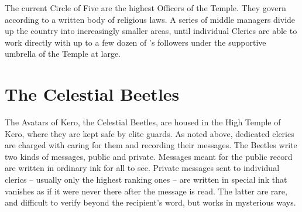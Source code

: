 \documentclass[blue]{GL2020}
\begin{document}
The current Circle of Five are the highest Officers of the Temple. They govern according to a written body of religious laws. A series of middle managers divide up the country into increasingly smaller areas, until individual Clerics are able to work directly with up to a few dozen of \cTechGod{}'s followers under the supportive umbrella of the Temple at large.

\section*{The Celestial Beetles}
The Avatars of Kero, the Celestial Beetles, are housed in the High Temple of Kero, where they are kept safe by elite guards. As noted above, dedicated clerics are charged with caring for them and recording their messages. The Beetles write two kinds of messages, public and private. Messages meant for the public record are written in ordinary ink for all to see. Private messages sent to individual clerics – usually only the highest ranking ones – are written in special ink that vanishes as if it were never there after the message is read. The latter are rare, and difficult to verify beyond the recipient’s word, but \cTechGod{} works in mysterious ways.
\end{document}
